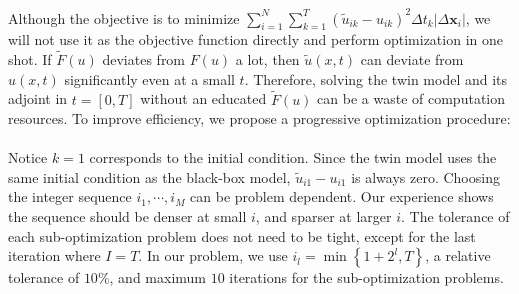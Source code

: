 \documentclass[a4paper,onecolumn]{article}
\theoremstyle{remark}
\begin{document}
\noindent Although the objective is to minimize 
$
\sum_{i=1}^{N}\sum_{k=1}^{T} \left(\tilde{u}_{ik} - u_{ik}\right)^2 \Delta t_k
\left| \Delta \mathbf{x}_i \right|
$, we will not use it as the objective function directly and perform optimization
in one shot. If $\tilde{F}(u)$ deviates from $F(u)$ a lot, then $\tilde{u}(x,t)$
can deviate from ${u}(x,t)$ significantly even at a small $t$. 
Therefore, solving the twin model and its adjoint in $t=[0,T]$ without
an educated $\tilde{F}(u)$ can be a waste of computation 
resources. To improve efficiency, we propose a progressive optimization
procedure:\\
\\

\noindent Notice $k=1$ corresponds to the initial condition. Since the twin model
uses the same initial condition as the black-box model, $\tilde{u}_{i1} - u_{i1}$
is always zero.
Choosing the integer sequence $i_1,\cdots,i_M$ can be problem dependent.
Our experience shows the sequence should be denser at small $i$, and sparser at larger $i$.
The tolerance of each sub-optimization problem does not need to be tight,
except for the last iteration where $I=T$.
In our problem, we use $i_l = \min\left\{ 1+2^l, T\right\}$,
a relative tolerance of $10\%$, and maximum $10$ iterations for the sub-optimization problems.\\
\end{document}
